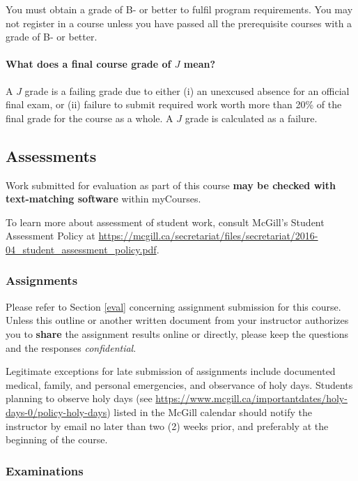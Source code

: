 \documentclass{article}
\begin{document}
You must obtain a grade of B- or better to fulfil program
requirements. You may not register in a course unless you have passed
all the prerequisite courses with a grade of B- or better.

\paragraph{What does a final course grade of $J$ mean?}

A $J$ grade is a failing grade due to either (i) an unexcused absence
for an official final exam, or (ii) failure to submit required work
worth more than 20\% of the final grade for the course as a whole. A
$J$ grade is calculated as a failure.

\newpage

\subsection{Assessments}

Work submitted for evaluation as part of this course {\bf may be
  checked with text-matching software} within myCourses.

To learn more about assessment of student work, consult McGill's
Student Assessment Policy at
\url{https://mcgill.ca/secretariat/files/secretariat/2016-04_student_assessment_policy.pdf}.


\subsubsection{Assignments}

Please refer to Section \ref{eval} concerning assignment submission
for this course. Unless this outline or another written document from
your instructor authorizes you to {\bf share} the assignment results
online or directly, please keep the questions and the responses {\em
  confidential}.

Legitimate exceptions for late submission of assignments include
documented medical, family, and personal emergencies, and observance
of holy days. Students planning to observe holy days (see
\url{https://www.mcgill.ca/importantdates/holy-days-0/policy-holy-days})
listed in the McGill calendar should notify the instructor by email no
later than two (2) weeks prior, and preferably at the beginning of the
course.

\subsubsection{Examinations}
\end{document}
